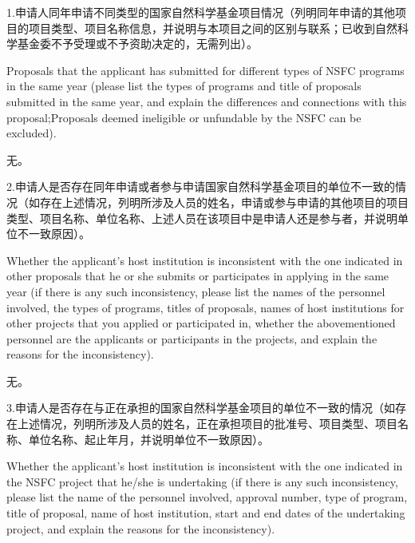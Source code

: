 \documentclass[12pt,UTF8,AutoFakeBold=4,a4paper]{ctexart}
\begin{document}
\bigskip

{\sihao \color{MsBlue} \kaishu 1.申请人同年申请不同类型的国家自然科学基金项目情况（列明同年申请的其他项目的项目类型、项目名称信息，并说明与本项目之间的区别与联系；已收到自然科学基金委不予受理或不予资助决定的，无需列出）。}

\bigskip

{\color{MsBlue} \xiaosihao {} 
Proposals that the applicant has submitted for different types of NSFC programs in the same year (please list the types of programs and title of proposals submitted in the same year, and explain the differences and connections with this proposal;Proposals deemed ineligible or unfundable by the NSFC can be excluded).}

\bigskip

无。

\bigskip

{\sihao \color{MsBlue} \kaishu 2.申请人是否存在同年申请或者参与申请国家自然科学基金项目的单位不一致的情况（如存在上述情况，列明所涉及人员的姓名，申请或参与申请的其他项目的项目类型、项目名称、单位名称、上述人员在该项目中是申请人还是参与者，并说明单位不一致原因）。}

\bigskip

{\color{MsBlue} \xiaosihao {} 
Whether the applicant's host institution is inconsistent with the one indicated in other proposals that he or she submits or participates in applying in the same year (if there is any such inconsistency, please list the names of the personnel involved, the types of programs, titles of proposals, names of host institutions for other projects that you applied or participated in, whether the abovementioned personnel are the applicants or participants in the projects, and explain the reasons for the inconsistency).}

\bigskip

无。

\bigskip

{\sihao \color{MsBlue} \kaishu 3.申请人是否存在与正在承担的国家自然科学基金项目的单位不一致的情况（如存在上述情况，列明所涉及人员的姓名，正在承担项目的批准号、项目类型、项目名称、单位名称、起止年月，并说明单位不一致原因）。}

\bigskip

{\color{MsBlue} \xiaosihao {} 
Whether the applicant's host institution is inconsistent with the one indicated in the NSFC project that he/she is undertaking (if there is any such inconsistency, please list the name of the personnel involved, approval number, type of program, title of proposal, name of host institution, start and end dates of the undertaking project, and explain the reasons for the inconsistency).}
\end{document}
